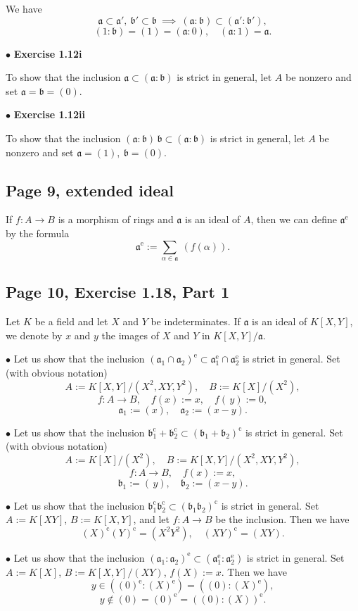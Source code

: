 \documentclass[parskip=half,fontsize=12pt]{scrartcl}%
\newcommand{\oo}{\operatorname}\newcommand{\ooo}{\operatorname*}
\newcommand{\mf}{\mathfrak}
\newcommand{\bu}{\bullet}
\begin{document}
We have 
$$
\mf a\subset\mf a',\ \mf b'\subset\mf b\ \implies\ (\mf a:\mf b)\subset(\mf a':\mf b'),
$$ 
$$
(1:\mf b)=(1)=(\mf a:0),\quad(\mf a:1)=\mf a.
$$

$\bu$ \textbf{Exercise 1.12i}%

To show that the inclusion $\mf a\subset(\mf a:\mf b)$ is strict in general, let $A$ be nonzero and set $\mf a=\mf b=(0)$.

$\bu$ \textbf{Exercise 1.12ii}%

To show that the inclusion $(\mf a\!:\!\mf b)\,\mf b\subset(\mf a:\mf b)$ is strict in general, let $A$ be nonzero and set $\mf a=(1),\ \mf b=(0)$.

\subsection{Page 9, extended ideal}%

If $f:A\to B$ is a morphism of rings and $\mf a$ is an ideal of $A$, then we can define $\mf a^{\oo e}$ by the formula
$$
\mf a^{\oo e}:=\sum_{\alpha\in\mf a}\ (f(\alpha)).
$$

\subsection{Page 10, Exercise 1.18, Part 1}%

Let $K$ be a field and let $X$ and $Y$ be indeterminates. If $\mf a$ is an ideal of $K[X,Y]$, we denote by $x$ and $y$ the images of $X$ and $Y$ in $K[X,Y]/\mf a$.

$\bu$ Let us show that the inclusion $(\mf a_1\cap\mf a_2)^{\oo e}\subset\mf a_1^{\oo e}\cap\mf a_2^{\oo e}$ is strict in general. Set (with obvious notation) 
$$
A:=K[X,Y]/(X^2,XY,Y^2),\quad B:=K[X]/(X^2),
$$ 
$$
f:A\to B,\quad f(x):=x,\quad f(\,y):=0,
$$ 
$$
\mf a_1:=(x),\quad\mf a_2:=(x-y).
$$

$\bu$ Let us show that the inclusion $\mf b_1^{\oo c}+\mf b_2^{\oo c}\subset(\mf b_1+\mf b_2)^{\oo c}$ is strict in general. Set (with obvious notation) 
$$
A:=K[X]/(X^2),\quad B:=K[X,Y]/(X^2,XY,Y^2),
$$ 
$$
f:A\to B,\quad f(x):=x,
$$ 
$$
\mf b_1:=(\,y),\quad\mf b_2:=(x-y).
$$

$\bu$ Let us show that the inclusion $\mf b_1^{\oo c}\mf b_2^{\oo c}\subset(\mf b_1\mf b_2)^{\oo c}$ is strict in general. Set $A:=K[XY]$, $B:=K[X,Y]$, and let $f:A\to B$ be the inclusion. Then we have 
$$
(X)^{\oo c}(Y)^{\oo c}=(X^2Y^2),\quad(XY)^{\oo c}=(XY).
$$

$\bu$ Let us show that the inclusion $(\mf a_1:\mf a_2)^{\oo e}\subset(\mf a_1^{\oo e}:\mf a_2^{\oo e})$ is strict in general. Set $A:=K[X]$, $B:=K[X,Y]/(XY)$, $f(X):=x$. Then we have 
$$
y\in((0)^{\oo e}:(X)^{\oo e})=((0):(X)^{\oo e}),
$$ 
$$y\notin(0)=(0)^{\oo e}=((0):(X))^{\oo e}.$$
\end{document}
